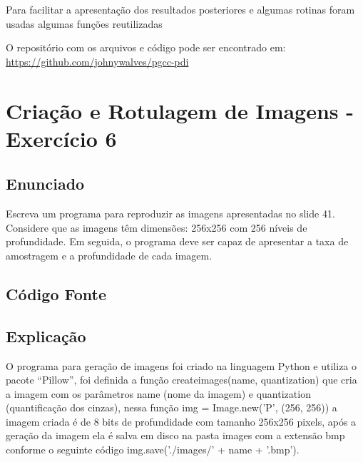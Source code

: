 \documentclass[10pt,a4paper]{article}
\begin{document}
\begin{flushleft}
Para facilitar a apresentação dos resultados posteriores e algumas rotinas foram usadas algumas funções reutilizadas
\end{flushleft}



\begin{flushleft}
O repositório com os arquivos e código pode ser encontrado em: \url{https://github.com/johnywalves/pgcc-pdi}
\end{flushleft}

\pagebreak

\section{Criação e Rotulagem de Imagens - Exercício 6}

\subsection{Enunciado}

Escreva um programa para reproduzir as imagens apresentadas no slide 41. Considere que as imagens têm dimensões: 256x256 com 256 níveis de profundidade. Em seguida, o programa deve ser capaz de apresentar a taxa de amostragem e a profundidade de cada imagem.

\subsection{Código Fonte}



\subsection{Explicação}

\begin{flushleft}
O programa para geração de imagens foi criado na linguagem Python e utiliza o pacote “Pillow”, foi definida a função {\ttfamily create\textunderscore images(name, quantization)} que cria a imagem com os parâmetros name (nome da imagem) e quantization (quantificação dos cinzas), nessa função {\ttfamily img = Image.new('P', (256, 256))} a imagem criada é de 8 bits de profundidade com tamanho 256x256 pixels, após a geração da imagem ela é salva em disco na pasta images com a extensão bmp conforme o seguinte código  {\ttfamily  img.save('./images/' + name + '.bmp')}.
\end{flushleft}
\end{document}
